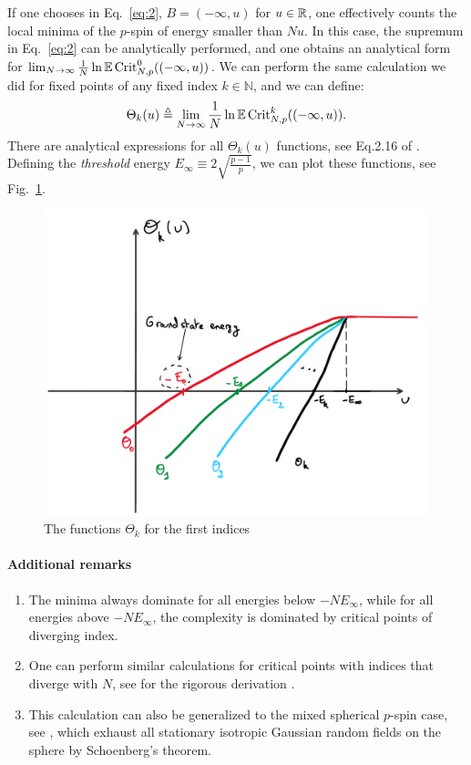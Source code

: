 \documentclass[amsmath,amssymb,nofootinbib,prd]{article}
\begin{document}
	If one chooses in Eq.~\ref{eq:2}, $B = (-\infty,u)$ for $u \in \mathbb{R}$, one effectively counts the local minima of the $p$-spin of energy smaller than $Nu$. In this case, the supremum in Eq.~\ref{eq:2} can be analytically performed, and one obtains an analytical form for $\lim_{N \to \infty} \frac{1}{N} \ln \mathbb{E} \, \mathrm{Crit}_{N,p}^0((-\infty,u))$.  We can perform the same calculation we did for fixed points of any fixed index $k \in \mathbb{N}$, and we can define:
	\begin{align}
	\Theta_k(u) \triangleq \lim_{N \to \infty} \frac{1}{N} \ln \mathbb{E} \, \mathrm{Crit}_{N,p}^k((-\infty,u)).
	\end{align}
	There are analytical expressions for all $\Theta_k(u)$ functions, see Eq.2.16 of \cite{auffinger2013random}. Defining the \emph{threshold} energy $E_\infty \equiv 2 \sqrt{\frac{p-1}{p}}$, we can plot these functions, see Fig.~\ref{fig}.
		\begin{figure}[h!]\label{fig}
		\centering
	\includegraphics[scale=0.4]{figure.pdf}
	\caption{The functions $\Theta_k$ for the first indices}
	\end{figure}

	
	\paragraph{Additional remarks}
	\begin{enumerate}
\item The minima always dominate for all energies below $-N E_\infty$, while for all energies above $-N E_\infty$, the complexity is dominated by critical points of diverging index.
\item One can perform similar calculations for critical points with indices that diverge with $N$, see for the rigorous derivation \cite{auffinger2013complexity}.
\item This calculation can also be generalized to the mixed spherical $p$-spin case, see \cite{auffinger2013complexity}, which exhaust all stationary isotropic Gaussian random fields on the sphere by Schoenberg's theorem.
	\end{enumerate}
	
 

\end{document}
